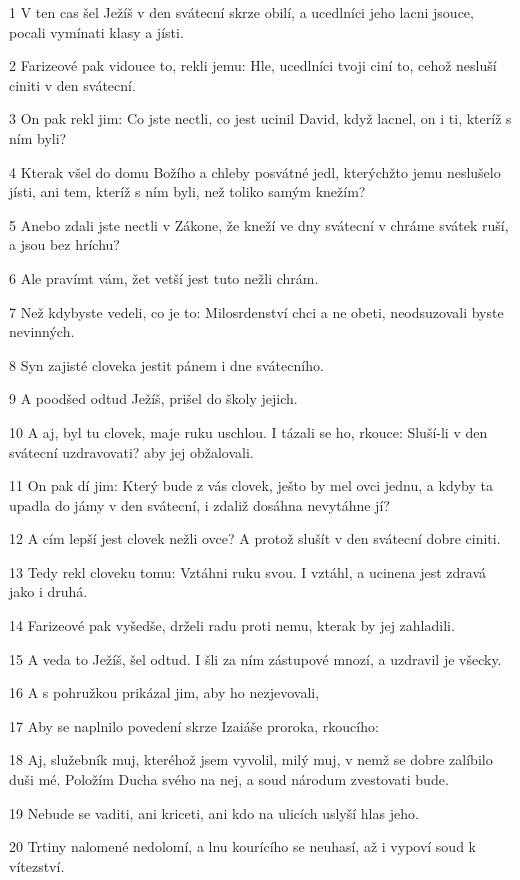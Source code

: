 \par 1 V ten cas šel Ježíš v den svátecní skrze obilí, a ucedlníci jeho lacni jsouce, pocali vymínati klasy a jísti.
\par 2 Farizeové pak vidouce to, rekli jemu: Hle, ucedlníci tvoji ciní to, cehož nesluší ciniti v den svátecní.
\par 3 On pak rekl jim: Co jste nectli, co jest ucinil David, když lacnel, on i ti, kteríž s ním byli?
\par 4 Kterak všel do domu Božího a chleby posvátné jedl, kterýchžto jemu neslušelo jísti, ani tem, kteríž s ním byli, než toliko samým knežím?
\par 5 Anebo zdali jste nectli v Zákone, že kneží ve dny svátecní v chráme svátek ruší, a jsou bez hríchu?
\par 6 Ale pravímt vám, žet vetší jest tuto nežli chrám.
\par 7 Než kdybyste vedeli, co je to: Milosrdenství chci a ne obeti, neodsuzovali byste nevinných.
\par 8 Syn zajisté cloveka jestit pánem i dne svátecního.
\par 9 A poodšed odtud Ježíš, prišel do školy jejich.
\par 10 A aj, byl tu clovek, maje ruku uschlou. I tázali se ho, rkouce: Sluší-li v den svátecní uzdravovati? aby jej obžalovali.
\par 11 On pak dí jim: Který bude z vás clovek, ješto by mel ovci jednu, a kdyby ta upadla do jámy v den svátecní, i zdaliž dosáhna nevytáhne jí?
\par 12 A cím lepší jest clovek nežli ovce? A protož slušít v den svátecní dobre ciniti.
\par 13 Tedy rekl cloveku tomu: Vztáhni ruku svou. I vztáhl, a ucinena jest zdravá jako i druhá.
\par 14 Farizeové pak vyšedše, drželi radu proti nemu, kterak by jej zahladili.
\par 15 A veda to Ježíš, šel odtud. I šli za ním zástupové mnozí, a uzdravil je všecky.
\par 16 A s pohružkou prikázal jim, aby ho nezjevovali,
\par 17 Aby se naplnilo povedení skrze Izaiáše proroka, rkoucího:
\par 18 Aj, služebník muj, kteréhož jsem vyvolil, milý muj, v nemž se dobre zalíbilo duši mé. Položím Ducha svého na nej, a soud národum zvestovati bude.
\par 19 Nebude se vaditi, ani kriceti, ani kdo na ulicích uslyší hlas jeho.
\par 20 Trtiny nalomené nedolomí, a lnu kourícího se neuhasí, až i vypoví soud k vítezství.
